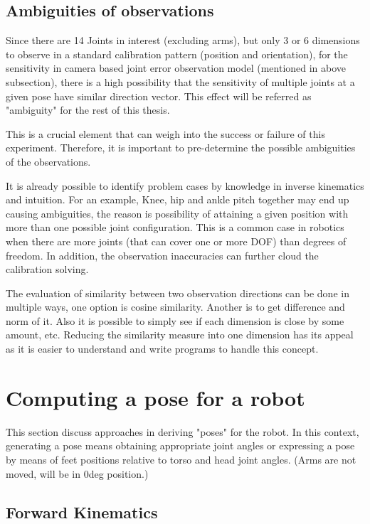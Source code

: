 \documentclass[english, printversion, nomenclature, notitle]{tuvisionthesis} %
\begin{document}
\subsection{Ambiguities of observations}
\label{subsec:ambiguities}

Since there are 14 Joints in interest (excluding arms), but only 3 or 6 dimensions to observe in a standard calibration pattern (position and orientation), for the sensitivity in camera based joint error observation model (mentioned in above subsection), there is a high possibility that the sensitivity of multiple joints at a given pose have similar direction vector. This effect will be referred as "ambiguity" for the rest of this thesis.
 
This is a crucial element that can weigh into the success or failure of this experiment. Therefore, it is important to pre-determine the possible ambiguities of the observations. 

It is already possible to identify problem cases by knowledge in inverse kinematics and intuition. For an example, Knee, hip and ankle pitch together may end up causing ambiguities, the reason is possibility of attaining a given position with more than one possible joint configuration. This is a common case in robotics when there are more joints (that can cover one or more DOF) than degrees of freedom. In addition, the observation inaccuracies can further cloud the calibration solving.

The evaluation of similarity between two observation directions can be done in multiple ways, one option is cosine similarity. Another is to get difference and norm of it. Also it is possible to simply see if each dimension is close by some amount, etc. Reducing the similarity measure into one dimension has its appeal as it is easier to understand and write programs to handle this concept.


\section{Computing a pose for a robot}
This section discuss approaches in deriving "poses" for the robot. In this context, generating a pose means obtaining appropriate joint angles or expressing a pose by means of feet positions relative to torso and head joint angles. (Arms are not moved, will be in 0deg position.)

\subsection{Forward Kinematics}
\end{document}
